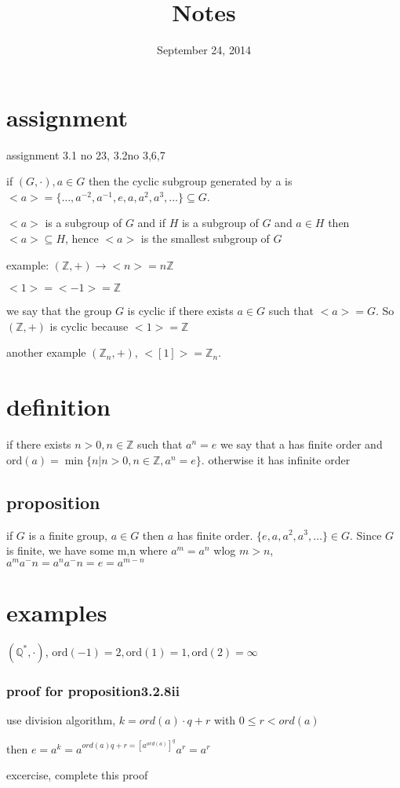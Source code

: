 \documentclass[letterpaper]{article}
\begin{document}
\title{Notes}
\date{September 24, 2014}
\maketitle
\section*{assignment}
assignment 3.1 no 23, 3.2no 3,6,7

if $(G,\cdot), a\in G$ then the cyclic subgroup generated by a is $<a>=\{\dots,a^{-2},a^{-1},e,a,a^2,a^3,\dots\}\subseteq G$.

$<a>$ is a subgroup of $G$ and if $H$ is a subgroup of $G$ and $a\in H$ then $<a>\subseteq H$, hence $<a>$ is the smallest subgroup of $G$

example: $(\mathbb{Z},+)\to <n>=n\mathbb{Z}$

$<1>=<-1>=\mathbb{Z}$

we say that the group $G$ is cyclic if there exists $a\in G$ such that $<a>=G$. So $(\mathbb{Z},+)$ is cyclic because $<1>=\mathbb{Z}$

another example $(\mathbb{Z}_n,+)$, $<[1]>=\mathbb{Z}_n$.

\section*{definition}
if there exists $n>0, n\in\mathbb{Z}$ such that $a^n=e$ we say that a has finite order and $\text{ord}(a)=\min\{n|n>0,n\in\mathbb{Z},a^n=e\}$. otherwise it has infinite order 

\subsection*{proposition}
if $G$ is a finite group, $a\in G$ then $a$ has finite order. $\{e,a,a^2,a^3,\dots\}\in G$. Since $G$ is finite, we have some m,n where $a^m=a^n$ wlog $m>n$, $a^ma^-n=a^na^-n=e=a^{m-n}$
\section*{examples}
$(\mathbb{Q}^*,\cdot)$, $\text{ord}(-1)=2, \text{ord}(1)=1, \text{ord}(2)=\infty$
\subsubsection*{proof for proposition3.2.8ii}
use division algorithm, $k=ord(a)\cdot q+r$ with $0\le r<ord(a)$

then $e=a^k=a^{ord(a)q+r=[a^{ord(a)}]^{q}}a^r=a^r$

excercise, complete this proof
\end{document}
